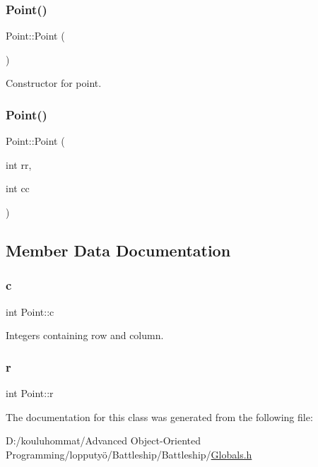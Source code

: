 \subsubsection{\texorpdfstring{Point()}{Point()}\hspace{0.1cm}{\footnotesize\ttfamily [1/2]}}
{\footnotesize\ttfamily Point\+::\+Point (\begin{DoxyParamCaption}{ }\end{DoxyParamCaption})\hspace{0.3cm}{\ttfamily [inline]}}



Constructor for point. 

\mbox{\label{class_point_a960b60e4a0e680c368e8437f48f7d0fd}} 
\subsubsection{\texorpdfstring{Point()}{Point()}\hspace{0.1cm}{\footnotesize\ttfamily [2/2]}}
{\footnotesize\ttfamily Point\+::\+Point (\begin{DoxyParamCaption}\item[{int}]{rr,  }\item[{int}]{cc }\end{DoxyParamCaption})\hspace{0.3cm}{\ttfamily [inline]}}



\subsection{Member Data Documentation}
\mbox{\label{class_point_a8277737deb586b2625d3106aa2fe32d6}} 
\subsubsection{\texorpdfstring{c}{c}}
{\footnotesize\ttfamily int Point\+::c}



Integers containing row and column. 

\mbox{\label{class_point_a5eec80a5eba17a6cfc509a17125a5f17}} 
\subsubsection{\texorpdfstring{r}{r}}
{\footnotesize\ttfamily int Point\+::r}



The documentation for this class was generated from the following file\+:\begin{DoxyCompactItemize}
\item 
D\+:/kouluhommat/\+Advanced Object-\/\+Oriented Programming/lopputyö/\+Battleship/\+Battleship/\mbox{\hyperlink{_globals_8h}{Globals.\+h}}\end{DoxyCompactItemize}
